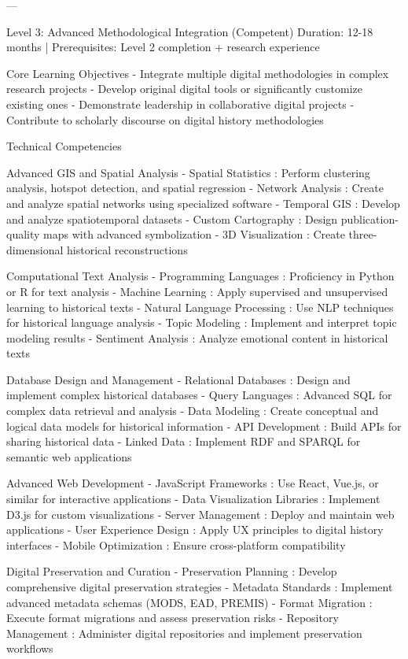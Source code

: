 \begin{appendices}
---

   Level 3: Advanced Methodological Integration (Competent)
 Duration: 12-18 months | Prerequisites: Level 2 completion + research experience 

    Core Learning Objectives
- Integrate multiple digital methodologies in complex research projects
- Develop original digital tools or significantly customize existing ones
- Demonstrate leadership in collaborative digital projects
- Contribute to scholarly discourse on digital history methodologies

    Technical Competencies

     Advanced GIS and Spatial Analysis
-  Spatial Statistics : Perform clustering analysis, hotspot detection, and spatial regression
-  Network Analysis : Create and analyze spatial networks using specialized software
-  Temporal GIS : Develop and analyze spatiotemporal datasets
-  Custom Cartography : Design publication-quality maps with advanced symbolization
-  3D Visualization : Create three-dimensional historical reconstructions

     Computational Text Analysis
-  Programming Languages : Proficiency in Python or R for text analysis
-  Machine Learning : Apply supervised and unsupervised learning to historical texts
-  Natural Language Processing : Use NLP techniques for historical language analysis
-  Topic Modeling : Implement and interpret topic modeling results
-  Sentiment Analysis : Analyze emotional content in historical texts

     Database Design and Management
-  Relational Databases : Design and implement complex historical databases
-  Query Languages : Advanced SQL for complex data retrieval and analysis
-  Data Modeling : Create conceptual and logical data models for historical information
-  API Development : Build APIs for sharing historical data
-  Linked Data : Implement RDF and SPARQL for semantic web applications

     Advanced Web Development
-  JavaScript Frameworks : Use React, Vue.js, or similar for interactive applications
-  Data Visualization Libraries : Implement D3.js for custom visualizations
-  Server Management : Deploy and maintain web applications
-  User Experience Design : Apply UX principles to digital history interfaces
-  Mobile Optimization : Ensure cross-platform compatibility

     Digital Preservation and Curation
-  Preservation Planning : Develop comprehensive digital preservation strategies
-  Metadata Standards : Implement advanced metadata schemas (MODS, EAD, PREMIS)
-  Format Migration : Execute format migrations and assess preservation risks
-  Repository Management : Administer digital repositories and implement preservation workflows


\end{appendices}
